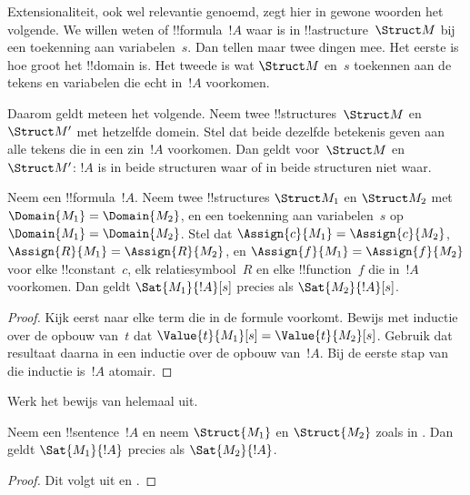 \documentclass[openany]{memoir}
\begin{document}
\begin{explain}
Extensionaliteit, ook wel relevantie genoemd, zegt hier in gewone
woorden het volgende. We willen weten of !!{formula}~$!A$ waar is in
!!a{structure}~$\Struct M$ bij een toekenning aan variabelen~$s$.
Dan tellen maar twee dingen mee. Het eerste is hoe groot het !!{domain}
is. Het tweede is wat $\Struct M$ en~$s$ toekennen aan de tekens en
variabelen die echt in~$!A$ voorkomen.

Daarom geldt meteen het volgende. Neem twee !!{structure}s~$\Struct M$
en~$\Struct M'$ met hetzelfde domein. Stel dat beide dezelfde betekenis
geven aan alle tekens die in een zin~$!A$ voorkomen. Dan geldt
voor~$\Struct M$ en~$\Struct M'$: $!A$ is in beide structuren waar of
in beide structuren niet waar.
\end{explain}

\begin{prop}[Extensionaliteit]
  Neem een !!{formula}~$!A$. Neem twee !!{structure}s $\Struct M_1$
  en $\Struct M_2$ met $\Domain{M_1} = \Domain{M_2}$, en een
  toekenning aan variabelen~$s$ op
  $\Domain{M_1} = \Domain{M_2}$. Stel dat
  $\Assign{c}{M_1} = \Assign{c}{M_2}$, $\Assign{R}{M_1}=\Assign{R}{M_2}$,
  en $\Assign{f}{M_1} = \Assign{f}{M_2}$ voor elke !!{constant}~$c$,
  elk relatiesymbool~$R$ en elke !!{function}~$f$ die in~$!A$
  voorkomen. Dan geldt $\Sat{M_1}{!A}[s]$ precies als
  $\Sat{M_2}{!A}[s]$.
\end{prop}

\begin{proof}
  Kijk eerst naar elke term die in de formule voorkomt. Bewijs met
  inductie over de opbouw van~$t$ dat
  $\Value{t}{M_1}[s] = \Value{t}{M_2}[s]$. Gebruik dat resultaat
  daarna in een inductie over de opbouw van~$!A$. Bij de eerste stap
  van die inductie is~$!A$ atomair.
\end{proof}

\begin{prob}
Werk het bewijs van 
helemaal uit.
\end{prob}

\begin{cor}
  Neem een !!{sentence}~$!A$ en neem $\Struct{M_1}$ en $\Struct{M_2}$
  zoals in . Dan geldt
  $\Sat{M_1}{!A}$ precies als $\Sat{M_2}{!A}$.
\end{cor}

\begin{proof}
Dit volgt uit  en
.
\end{proof}
\end{document}
